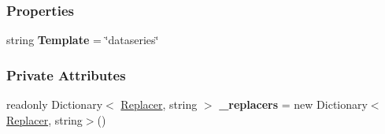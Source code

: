 \subsubsection*{Properties}
\begin{DoxyCompactItemize}
\item 
\mbox{\label{classHighcharts_1_1DataSeries_a5b6ed5b7cf2b4c06fcab23ae89e90697}} 
string {\bfseries Template} = \char`\"{}dataseries\char`\"{}
\end{DoxyCompactItemize}
\subsubsection*{Private Attributes}
\begin{DoxyCompactItemize}
\item 
\mbox{\label{classHighcharts_1_1DataSeries_a2f6ad2d7ce597e1ca217d737983ff522}} 
readonly Dictionary$<$ \hyperlink{classHighcharts_1_1Replacer}{Replacer}, string $>$ {\bfseries \+\_\+replacers} = new Dictionary$<$\hyperlink{classHighcharts_1_1Replacer}{Replacer}, string$>$()
\end{DoxyCompactItemize}
